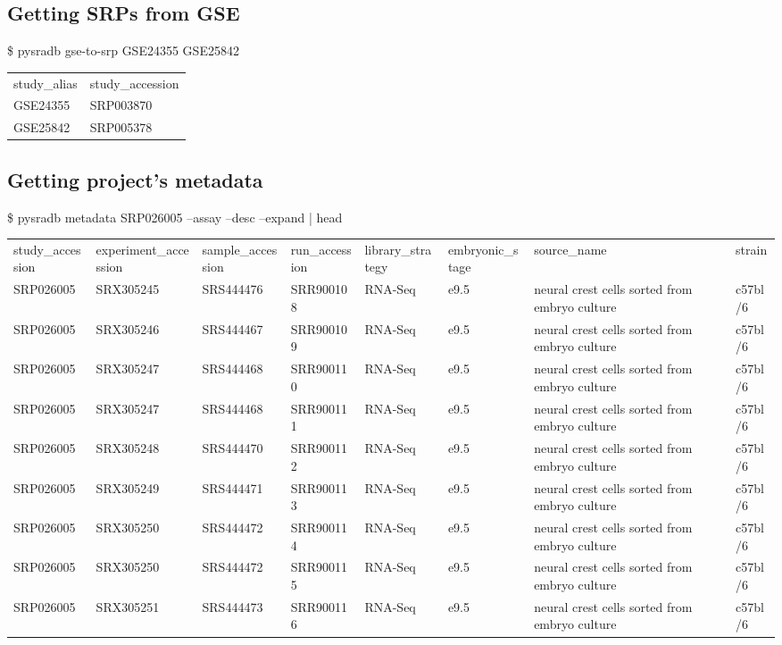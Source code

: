 \documentclass[9pt,a4paper]{extarticle}
\newenvironment{allintypewriter}{\ttfamily}{\par}
\begin{document}
\subsection*{Getting SRPs from GSE}
\begin{allintypewriter}
\$ pysradb gse-to-srp GSE24355 GSE25842
\begin{table}[H]
    \begin{tabular}{ll}
    study_alias & study_accession\\
    GSE24355 & SRP003870\\
    GSE25842 & SRP005378\\
    \end{tabular}
\end{table}
\end{allintypewriter}

\subsection*{Getting project's metadata}
\begin{allintypewriter}
\$ pysradb metadata SRP026005 --assay --desc --expand  | head
\footnotesize{
\begin{table}[H]
    \begin{tabular}{llllllll}
study_accession & experiment_accession & sample_accession & run_accession & library_strategy & embryonic_stage & source_name &  strain  \\
SRP026005 &   SRX305245 & SRS444476 & SRR900108 & RNA-Seq &   e9.5 & neural crest cells sorted from embryo culture & c57bl/6\\
SRP026005 &   SRX305246 & SRS444467 & SRR900109 & RNA-Seq &   e9.5 & neural crest cells sorted from embryo culture & c57bl/6\\
SRP026005 &   SRX305247 & SRS444468 & SRR900110 & RNA-Seq &   e9.5 & neural crest cells sorted from embryo culture & c57bl/6\\
SRP026005 &   SRX305247 & SRS444468 & SRR900111 & RNA-Seq &   e9.5 & neural crest cells sorted from embryo culture & c57bl/6\\
SRP026005 &   SRX305248 & SRS444470 & SRR900112 & RNA-Seq &   e9.5 & neural crest cells sorted from embryo culture & c57bl/6\\
SRP026005 &   SRX305249 & SRS444471 & SRR900113 & RNA-Seq &   e9.5 & neural crest cells sorted from embryo culture & c57bl/6\\
SRP026005 &   SRX305250 & SRS444472 & SRR900114 & RNA-Seq &   e9.5 & neural crest cells sorted from embryo culture & c57bl/6\\
SRP026005 &   SRX305250 & SRS444472 & SRR900115 & RNA-Seq &   e9.5 & neural crest cells sorted from embryo culture & c57bl/6\\
SRP026005 &   SRX305251 & SRS444473 & SRR900116 & RNA-Seq &   e9.5 & neural crest cells sorted from embryo culture & c57bl/6\\
\end{tabular}
\end{table}
}
\end{allintypewriter}
\end{document}
